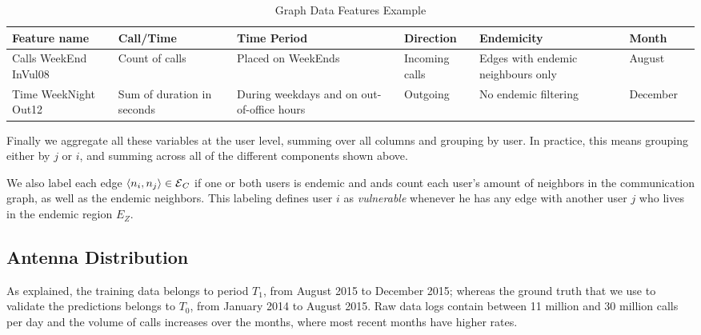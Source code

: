 \begin{table}[ht]
	\caption{Graph Data Features Example}
	\label{tab:data_example}
	\centering
	\begin{tabular} {|p{1.5cm}|p{1.5cm}|p{2cm}|p{1.5cm}|p{2cm}|p{1.5cm}|p{1cm}}
		\toprule
		Feature name & Call/Time & Time Period & Direction & Endemicity & Month\\
		\midrule
		Calls WeekEnd InVul08       & Count of calls & Placed on WeekEnds & Incoming calls & Edges with endemic neighbours only & August\\
		\midrule
		Time WeekNight Out12 & Sum of duration in seconds & During weekdays and on out-of-office hours & Outgoing   & No endemic filtering   & December \\

		\bottomrule
	\end{tabular}
\end{table}



Finally we aggregate all these variables at the user level, summing over all columns and grouping by user.
In practice, this means grouping either by $j$ or $i$, and summing across all of the different components shown above.

We also label each edge $\left< n_i, n_j \right> \in \operatorname{\mathcal{E}}_C$ if one or both users is endemic and
ands count each user's amount of neighbors in the communication graph, as well as the endemic neighbors. This labeling defines user $i$ as \textit{vulnerable} whenever he has any edge with another user $j$ who lives in the endemic region $E_Z$.



\subsection{Antenna Distribution}

As explained, the training data belongs to period $T_1$, from August 2015 to December 2015;
whereas the ground truth that we use to validate the predictions belongs to $T_0$, from January 2014 to August 2015. Raw data logs contain between 11 million and 30 million calls per day and the volume of calls increases over the months, where most recent months have higher rates.

